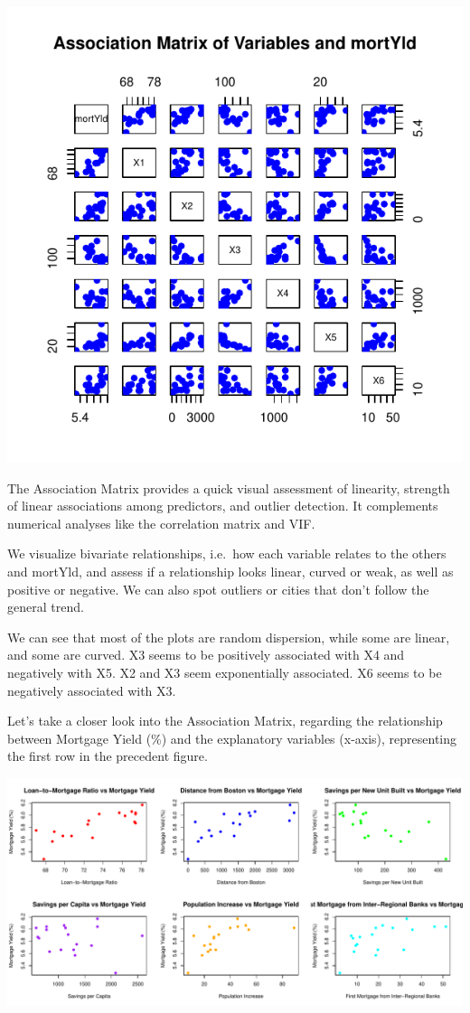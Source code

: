 \documentclass[
  11pt,
]{article}
\begin{document}
\includegraphics{Figs/unnamed-chunk-5-1.pdf}

The Association Matrix provides a quick visual assessment of linearity,
strength of linear associations among predictors, and outlier detection.
It complements numerical analyses like the correlation matrix and VIF.

We visualize bivariate relationships, i.e.~how each variable relates to
the others and mortYld, and assess if a relationship looks linear,
curved or weak, as well as positive or negative. We can also spot
outliers or cities that don't follow the general trend.

We can see that most of the plots are random dispersion, while some are
linear, and some are curved. X3 seems to be positively associated with
X4 and negatively with X5. X2 and X3 seem exponentially associated. X6
seems to be negatively associated with X3.

Let's take a closer look into the Association Matrix, regarding the
relationship between Mortgage Yield (\%) and the explanatory variables
(x-axis), representing the first row in the precedent figure.

\includegraphics{Figs/unnamed-chunk-6-1.pdf}
\end{document}
